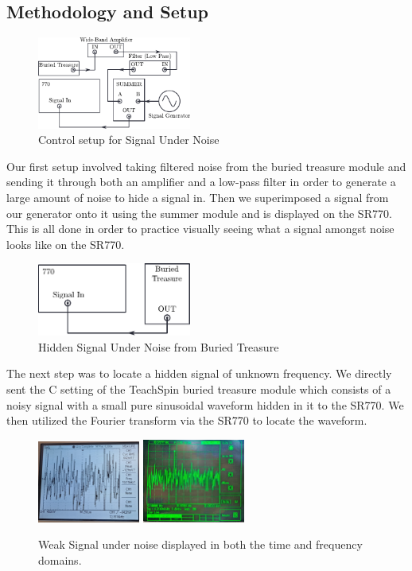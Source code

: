 \documentclass[prl,twocolumn,superscriptaddress,floatfix]{revtex4}
\begin{document}
\subsection{Methodology and Setup}
\begin{figure}[H]
    \includegraphics[width=0.45\textwidth]{exp1_1.pdf}
    \caption{Control setup for Signal Under Noise}
    \label{fig:exp1}
\end{figure}
Our first setup involved taking filtered noise from the buried treasure module and sending it through both an amplifier and a low-pass filter in order to generate a large amount of noise to hide a signal in. Then we superimposed a signal from our generator onto it using the summer module and is displayed on the SR770. This is all done in order to practice visually seeing what a signal amongst noise looks like on the SR770.
\begin{figure}[H]
    \includegraphics[width=0.45\textwidth]{exp1_2.pdf}
    \caption{Hidden Signal Under Noise from Buried Treasure}
    \label{fig:exp2}
\end{figure}
The next step was to locate a hidden signal of unknown frequency. We directly sent the C setting of the TeachSpin buried treasure module which consists of a noisy signal with a small pure sinusoidal waveform hidden in it to the SR770. We then utilized the Fourier transform via the SR770 to locate the waveform.
\begin{figure}[H]
    \begin{center}
    \includegraphics[width = 0.3\textwidth]{Time Data C.jpg}
    \includegraphics[width = 0.3\textwidth]{Signal C under Noise.jpg}
    \caption{\label{fig:2}Weak Signal under noise displayed in both the time and frequency domains.}
    \end{center}
\end{figure}
\end{document}
